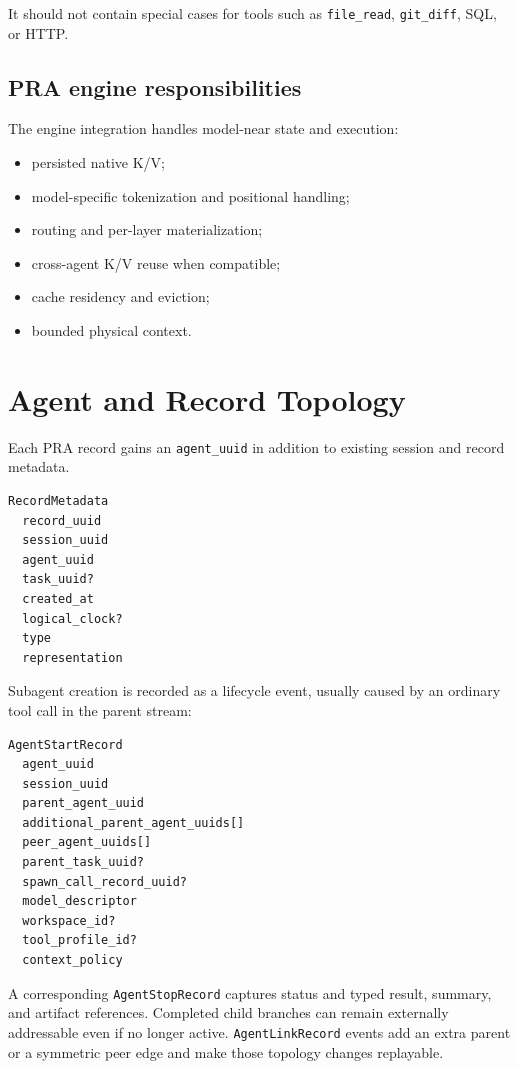 \documentclass[11pt]{article}
\begin{document}
It should not contain special cases for tools such as \texttt{file\_read}, \texttt{git\_diff}, SQL, or HTTP.

\subsection{PRA engine responsibilities}

The engine integration handles model-near state and execution:

\begin{itemize}[leftmargin=*]
    \item persisted native K/V;
    \item model-specific tokenization and positional handling;
    \item routing and per-layer materialization;
    \item cross-agent K/V reuse when compatible;
    \item cache residency and eviction;
    \item bounded physical context.
\end{itemize}

\section{Agent and Record Topology}

Each PRA record gains an \texttt{agent\_uuid} in addition to existing session and record metadata.

\begin{lstlisting}[basicstyle=\ttfamily\small]
RecordMetadata
  record_uuid
  session_uuid
  agent_uuid
  task_uuid?
  created_at
  logical_clock?
  type
  representation
\end{lstlisting}

Subagent creation is recorded as a lifecycle event, usually caused by an ordinary tool call in the parent stream:

\begin{lstlisting}[basicstyle=\ttfamily\small]
AgentStartRecord
  agent_uuid
  session_uuid
  parent_agent_uuid
  additional_parent_agent_uuids[]
  peer_agent_uuids[]
  parent_task_uuid?
  spawn_call_record_uuid?
  model_descriptor
  workspace_id?
  tool_profile_id?
  context_policy
\end{lstlisting}

A corresponding \texttt{AgentStopRecord} captures status and typed result,
summary, and artifact references. Completed child branches can remain
externally addressable even if no longer active. \texttt{AgentLinkRecord}
events add an extra parent or a symmetric peer edge and make those topology
changes replayable.
\end{document}
